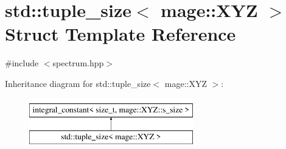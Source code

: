 \hypertarget{structstd_1_1tuple__size_3_01mage_1_1_x_y_z_01_4}{}\section{std\+:\+:tuple\+\_\+size$<$ mage\+:\+:X\+YZ $>$ Struct Template Reference}
\label{structstd_1_1tuple__size_3_01mage_1_1_x_y_z_01_4}


{\ttfamily \#include $<$spectrum.\+hpp$>$}

Inheritance diagram for std\+:\+:tuple\+\_\+size$<$ mage\+:\+:X\+YZ $>$\+:\begin{figure}[H]
\begin{center}
\leavevmode
\includegraphics[height=2.000000cm]{structstd_1_1tuple__size_3_01mage_1_1_x_y_z_01_4}
\end{center}
\end{figure}
